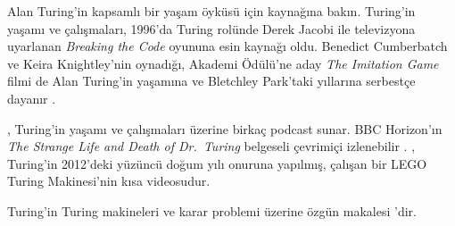 \begin{reading}
Alan Turing'in kapsamlı bir yaşam öyküsü için \citet{Hodges2014} kaynağına
bakın. Turing'in yaşamı ve çalışmaları, 1996'da Turing rolünde Derek Jacobi
ile televizyona uyarlanan \emph{Breaking the Code} oyununa esin kaynağı oldu.
Benedict Cumberbatch ve Keira Knightley'nin oynadığı, Akademi Ödülü'ne aday
\emph{The Imitation Game} filmi de Alan Turing'in yaşamına ve Bletchley
Park'taki yıllarına serbestçe dayanır \citep{Imitation2014}.

\citet{Radiolab2012}, Turing'in yaşamı ve çalışmaları üzerine birkaç podcast
sunar. BBC Horizon'ın \emph{The Strange Life and Death of Dr.~Turing}
belgeseli çevrimiçi izlenebilir \citep{Sykes1992}. \citep{Theelen2012},
Turing'in 2012'deki yüzüncü doğum yılı onuruna yapılmış, çalışan bir LEGO
Turing Makinesi'nin kısa videosudur.

Turing'in Turing makineleri ve karar problemi üzerine özgün makalesi
\citet{Turing1937}'dir.
\end{reading}

